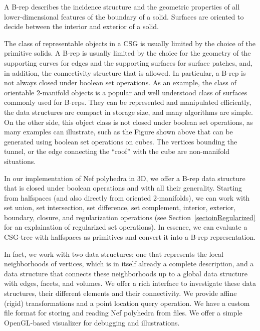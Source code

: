 A B-rep describes the incidence structure and the geometric properties
of all lower-dimensional features of the boundary of a solid. Surfaces
are oriented to decide between the interior and exterior of a solid.

The class of representable objects in a CSG is usually limited by the
choice of the primitive solids. A B-rep is usually limited by the
choice for the geometry of the supporting curves for edges and the
supporting surfaces for surface patches, and, in addition, the
connectivity structure that is allowed. In particular, a B-rep is not
always closed under boolean set operations.  As an example, the class
of orientable 2-manifold objects is a popular and well understood
class of surfaces commonly used for B-reps. They can be represented
and manipulated efficiently, the data structures are compact in
storage size, and many algorithms are simple. On the other side, this
object class is not closed under boolean set operations, as many
examples can illustrate, such as the Figure shown above that can be
generated using boolean set operations on cubes. The vertices bounding
the tunnel, or the edge connecting the ``roof'' with the cube are
non-manifold situations.

In our implementation of Nef polyhedra in 3D, we offer a B-rep data
structure that is closed under boolean operations and with all their
generality. Starting from halfspaces (and also directly from oriented
2-manifolds), we can work with set union, set intersection, set
difference, set complement, interior, exterior, boundary, closure, and
regularization operations (see Section~\ref{sectoinRegularized} 
for an explaination of regularized
set operations). In essence, we can evaluate a CSG-tree with
halfspaces as primitives and convert it into a B-rep representation.

In fact, we work with two data structures; one that represents the
local neighborhoods of vertices, which is in itself already a complete
description, and a data structure that connects these neighborhoods up
to a global data structure with edges, facets, and volumes. We offer a
rich interface to investigate these data structures, their different
elements and their connectivity. We provide affine (rigid)
transformations and a point location query operation. We have a custom
file format for storing and reading Nef polyhedra from files. We offer
a simple OpenGL-based visualizer for debugging and illustrations.


